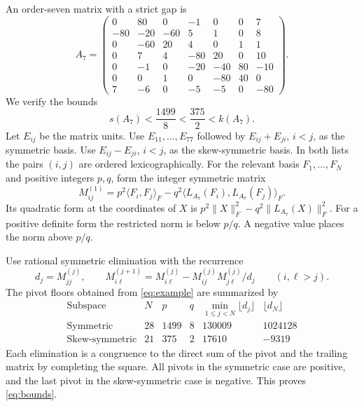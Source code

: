 \documentclass[11pt,letterpaper]{article}
\newcommand{\ip}[2]{\langle #1,#2\rangle_F}
\begin{document}
An order-seven matrix with a strict gap is
\begin{equation}\label{eq:example}
A_7=\begin{pmatrix}
   0 &  80 &   0 &  -1 &   0 &   0 &   7\\
 -80 & -20 & -60 &   5 &   1 &   0 &   8\\
   0 & -60 &  20 &   4 &   0 &   1 &   1\\
   0 &   7 &   4 & -80 &  20 &   0 &  10\\
   0 &  -1 &   0 & -20 & -40 &  80 & -10\\
   0 &   0 &   1 &   0 & -80 &  40 &   0\\
   7 &  -6 &   0 &  -5 &  -5 &   0 & -80
\end{pmatrix}.
\end{equation}
We verify the bounds
\begin{equation}\label{eq:bounds}
s(A_7)<\frac{1499}{8}<\frac{375}{2}<k(A_7).
\end{equation}
Let \(E_{ij}\) be the matrix units. Use \(E_{11},\dots,E_{77}\)
followed by \(E_{ij}+E_{ji}\), \(i<j\), as the symmetric basis.
Use \(E_{ij}-E_{ji}\), \(i<j\), as the skew-symmetric basis.
In both lists the pairs \((i,j)\) are ordered lexicographically.
For the relevant basis \(F_1,\dots,F_N\) and positive integers
\(p,q\), form the integer symmetric matrix
\[
M^{(1)}_{ij}=p^2\ip{F_i}{F_j}
       -q^2\ip{L_{A_7}(F_i)}{L_{A_7}(F_j)} .
\]
Its quadratic form at the coordinates of \(X\) is
\(p^2\|X\|_F^2-q^2\|L_{A_7}(X)\|_F^2\).
For a positive definite form the restricted norm is below \(p/q\).
A negative value places the norm above \(p/q\).

Use rational symmetric elimination with the recurrence
\[
d_j=M^{(j)}_{jj},\qquad
M^{(j+1)}_{i\ell}=M^{(j)}_{i\ell}
    -M^{(j)}_{ij}M^{(j)}_{j\ell}/d_j\qquad(i,\ell>j).
\]
The pivot floors obtained from \eqref{eq:example} are summarized by
\[
\begin{array}{lrrr|rr}
\text{Subspace} & N & p & q & \min_{1\le j<N}\lfloor d_j\rfloor
                            & \lfloor d_N\rfloor\\ \hline
\text{Symmetric}      &28&1499&8&130009&1024128\\
\text{Skew-symmetric} &21&375 &2& 17610&  -9319
\end{array}
\]
Each elimination is a congruence to the direct sum of the pivot
and the trailing matrix by completing the square.
All pivots in the symmetric case
are positive, and the last pivot in the skew-symmetric case is
negative. This proves \eqref{eq:bounds}.
\end{document}
